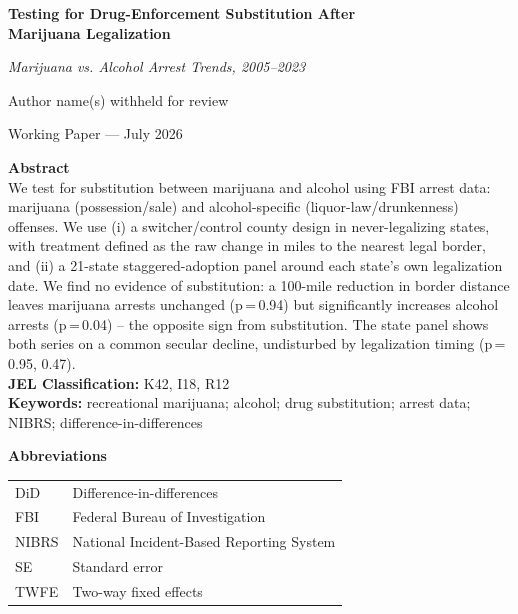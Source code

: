 \documentclass[11pt]{article}
\title{}
\author{}
\date{}
\begin{document}
\begin{titlepage}
\begin{center}
\vspace*{1.5cm}
{\LARGE \bfseries Testing for Drug-Enforcement Substitution After\\
Marijuana Legalization\par}
\vspace{0.3cm}
{\large \itshape Marijuana vs. Alcohol Arrest Trends, 2005--2023\par}
\vspace{1.2cm}
{\large Author name(s) withheld for review\par}
\vspace{0.3cm}
{\normalsize Working Paper --- July 2026\par}
\end{center}

\vspace{1.2cm}
\noindent\textbf{Abstract} \\[4pt]
\noindent We test for substitution between marijuana and alcohol
using FBI arrest data: marijuana (possession/sale) and
alcohol-specific (liquor-law/drunkenness) offenses. We use (i) a
switcher/control county design in never-legalizing states, with
treatment defined as the raw change in miles to the nearest legal
border, and (ii) a 21-state staggered-adoption panel around each
state's own legalization date. We find no evidence of substitution: a
100-mile reduction in border distance leaves marijuana arrests
unchanged (p\,=\,0.94) but significantly increases alcohol arrests
(p\,=\,0.04) -- the opposite sign from substitution. The state panel
shows both series on a common secular decline, undisturbed by
legalization timing (p\,=\,0.95, 0.47). \\[10pt]
\noindent\textbf{JEL Classification:} K42, I18, R12 \\
\noindent\textbf{Keywords:} recreational marijuana; alcohol; drug
substitution; arrest data; NIBRS; difference-in-differences

\vfill
\noindent\textbf{Abbreviations} \\[2pt]
\noindent
\begin{tabular}{@{}ll@{}}
DiD    & Difference-in-differences \\
FBI    & Federal Bureau of Investigation \\
NIBRS  & National Incident-Based Reporting System \\
SE     & Standard error \\
TWFE   & Two-way fixed effects \\
\end{tabular}

\vspace{0.5cm}
\end{titlepage}
\end{document}
